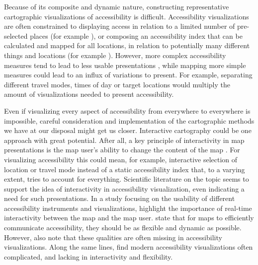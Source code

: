 


Because of its composite and dynamic nature,
constructing representative cartographic visualizations of accessibility is difficult.
Accessibility visualizations are often constrained
to displaying access in relation to
a limited number of pre-selected places (for example \textcite{wei2018}),
or composing an accessibility index
that can be calculated and mapped for all locations,
in relation to potentially many different things and locations
(for example \textcite{kim2019}).
However, more complex accessibility measures tend to lead to
less usable presentations \parencite{te2014},
while mapping more simple measures could lead to an influx of variations to present.
For example, separating different travel modes, times of day or target locations
would multiply the amount of visualizations needed to present accessibility.




Even if visualizing every aspect of accessibility
from everywhere to everywhere is impossible,
careful consideration and implementation
of the cartographic methods we have at our disposal might get us closer.
Interactive cartography could be one approach with great potential.
After all, a key principle of interactivity in map presentations is
the map user's ability to change the content of the map \parencite{rot2013b}.
For visualizing accessibility this could mean, for example,
interactive selection of location or travel mode instead of
a static accessibility index that, to a varying extent,
tries to account for everything.
Scientific literature on the topic seems to support the idea of
interactivity in accessibility visualization,
even indicating a need for such presentations.
In a study focusing on the usability of
different accessibility instruments and visualizations,  %
\textcite{te2014} highlight the importance of
real-time interactivity between the map and the map user.
\textcite{but2018} state that for maps to efficiently communicate accessibility,
they should be as flexible and dynamic as possible.
However, \textcite{but2018} also note that
these qualities are often missing in accessibility visualizations.
Along the same lines,
\textcite{paj2021} find modern accessibility visualizations often complicated,
and lacking in interactivity and flexibility.


